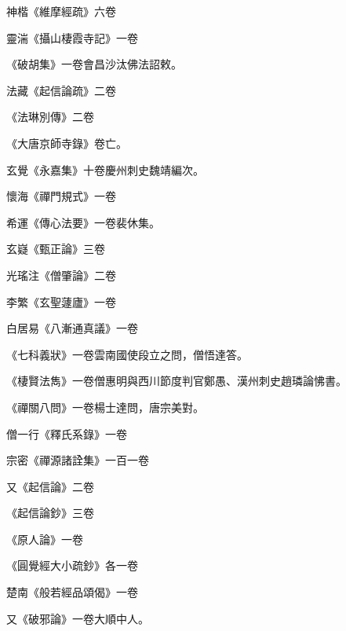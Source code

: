 \begin{pinyinscope}
 神楷《維摩經疏》六卷



 靈湍《攝山棲霞寺記》一卷



 《破胡集》一卷會昌沙汰佛法詔敕。



 法藏《起信論疏》二卷



 《法琳別傳》二卷



 《大唐京師寺錄》卷亡。



 玄覺《永嘉集》十卷慶州刺史魏靖編次。



 懷海《禪門規式》一卷



 希運《傳心法要》一卷裴休集。



 玄嶷《甄正論》三卷



 光瑤注《僧肇論》二卷



 李繁《玄聖蘧廬》一卷



 白居易《八漸通真議》一卷



 《七科義狀》一卷雲南國使段立之問，僧悟達答。



 《棲賢法雋》一卷僧惠明與西川節度判官鄭愚、漢州刺史趙璘論怫書。



 《禪關八問》一卷楊士達問，唐宗美對。



 僧一行《釋氏系錄》一卷



 宗密《禪源諸詮集》一百一卷



 又《起信論》二卷



 《起信論鈔》三卷



 《原人論》一卷



 《圓覺經大小疏鈔》各一卷



 楚南《般若經品頌偈》一卷



 又《破邪論》一卷大順中人。




\end{pinyinscope}
